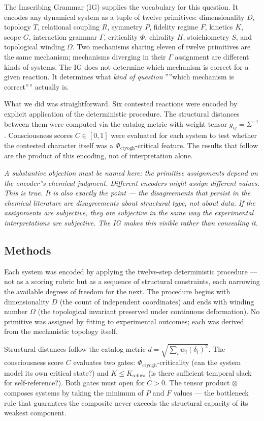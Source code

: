 \documentclass[12pt,a4paper]{article}
\begin{document}
The Imscribing Grammar (IG) supplies the vocabulary for this question. It encodes any dynamical system as a tuple of twelve primitives: dimensionality $D$, topology $T$, relational coupling $R$, symmetry $P$, fidelity regime $F$, kinetics $K$, scope $G$, interaction grammar $\Gamma$, criticality $\Phi$, chirality $H$, stoichiometry $S$, and topological winding $\Omega$. Two mechanisms sharing eleven of twelve primitives are the same mechanism; mechanisms diverging in their $\Gamma$ assignment are different kinds of systems. The IG does not determine which mechanism is correct for a given reaction. It determines what \emph{kind of question} ''''which mechanism is correct'''' actually is.

What we did was straightforward. Six contested reactions were encoded by explicit application of the deterministic procedure. The structural distances between them were computed via the catalog metric with weight tensor $g_{ij} = \Sigma^{-1}$. Consciousness scores $C \in [0,1]$ were evaluated for each system to test whether the contested character itself was a $\Phi_{\text{ctyogh}}$-critical feature. The results that follow are the product of this encoding, not of interpretation alone.

\emph{A substantive objection must be named here: the primitive assignments depend on the encoder''s chemical judgment. Different encoders might assign different values. This is true. It is also exactly the point --- the disagreements that persist in the chemical literature are disagreements about structural type, not about data. If the assignments are subjective, they are subjective in the same way the experimental interpretations are subjective. The IG makes this visible rather than concealing it.}

\subsection{Methods}

Each system was encoded by applying the twelve-step deterministic procedure --- not as a scoring rubric but as a sequence of structural constraints, each narrowing the available degrees of freedom for the next. The procedure begins with dimensionality $D$ (the count of independent coordinates) and ends with winding number $\Omega$ (the topological invariant preserved under continuous deformation). No primitive was assigned by fitting to experimental outcomes; each was derived from the mechanistic topology itself.

Structural distances follow the catalog metric $d = \sqrt{\sum_i w_i (\delta_i)^2}$. The consciousness score $C$ evaluates two gates: $\Phi_{\text{ctyogh}}$-criticality (can the system model its own critical state?) and $K \leq K_{\text{schwa}}$ (is there sufficient temporal slack for self-reference?). Both gates must open for $C > 0$. The tensor product $\otimes$ composes systems by taking the minimum of $P$ and $F$ values --- the bottleneck rule that guarantees the composite never exceeds the structural capacity of its weakest component.
\end{document}
